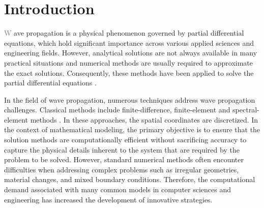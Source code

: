 \documentclass[11pt,twoside]{article}
\begin{document}
\section*{Introduction}\label{sec:introduction}

\lettrine{\textcolor{gray}{W}}{ }ave propagation is a physical phenomenon governed by partial differential equations, 
which hold significant importance across various applied sciences and engineering fields. However, analytical 
solutions are not always available in many practical situations and numerical methods are usually required to 
approximate the exact solutions. Consequently, these methods have been applied to solve the partial differential 
equations \citep{Seriani2020}.

In the field of wave propagation, numerous techniques address wave propagation challenges. Classical methods include 
finite-difference, finite-element and spectral-element methods \citep{Moczo, virieux_review_2011, Igel2017,
komatitsch_introduction_1999,chaljub_spectral-element_2007}. In these approaches, the spatial coordinates are discretized. 
In the context of mathematical modeling, the primary objective is to ensure that the solution methods 
are computationally efficient without sacrificing accuracy to capture the physical details inherent to the 
system that are required by the problem to be solved. However, standard numerical methods often encounter 
difficulties when addressing complex problems such as irregular geometries, material changes, and mixed boundary 
conditions. Therefore, the computational demand associated with many common models in computer sciences and engineering 
has increased the development of innovative strategies.
\end{document}

